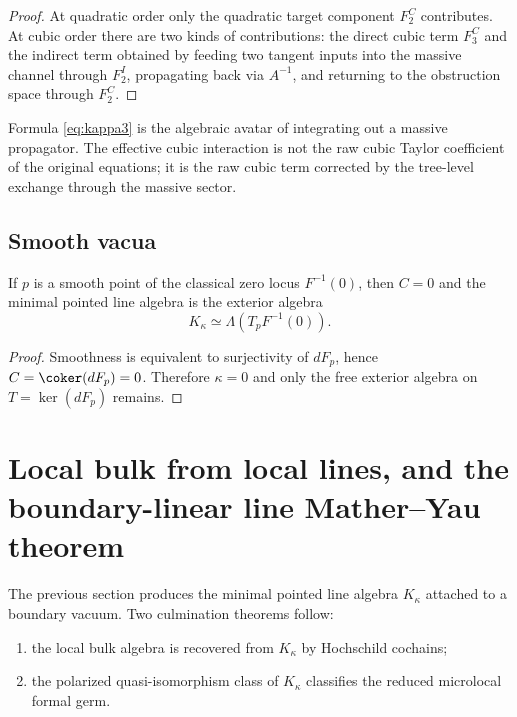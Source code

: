 \begin{proof}
At quadratic order only the quadratic target component $F_2^C$ contributes. At cubic order there are two kinds of contributions: the direct cubic term $F_3^C$ and the indirect term obtained by feeding two tangent inputs into the massive channel through $F_2^I$, propagating back via $A^{-1}$, and returning to the obstruction space through $F_2^C$.
\end{proof}

\begin{remark}
Formula \eqref{eq:kappa3} is the algebraic avatar of integrating out a massive propagator. The effective cubic interaction is not the raw cubic Taylor coefficient of the original equations; it is the raw cubic term corrected by the tree-level exchange through the massive sector.
\end{remark}

\subsection{Smooth vacua}

\begin{corollary}\label{cor:smooth-formality}
If $p$ is a smooth point of the classical zero locus $F^{-1}(0)$, then $C=0$ and the minimal pointed line algebra is the exterior algebra
\[
K_\kappa\simeq \Lambda(T_pF^{-1}(0)).
\]
\end{corollary}

\begin{proof}
Smoothness is equivalent to surjectivity of $dF_p$, hence $C=\coker(dF_p)=0$. Therefore $\kappa=0$ and only the free exterior algebra on $T=\ker(dF_p)$ remains.
\end{proof}


\section{Local bulk from local lines, and the boundary-linear line Mather--Yau theorem}\label{sec:classification}

The previous section produces the minimal pointed line algebra $K_\kappa$ attached to a boundary vacuum. Two culmination theorems follow:
\begin{enumerate}[label=(\arabic*),leftmargin=1.8em]
\item the local bulk algebra is recovered from $K_\kappa$ by Hochschild cochains;
\item the polarized quasi-isomorphism class of $K_\kappa$ classifies the reduced microlocal formal germ.
\end{enumerate}

